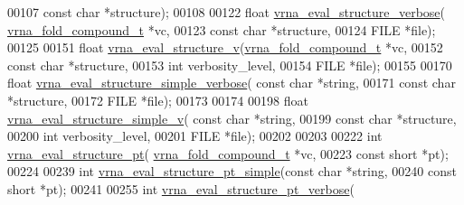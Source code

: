 \begin{DoxyCode}
00107                                   \textcolor{keyword}{const} \textcolor{keywordtype}{char} *structure);
00108 
00122 \textcolor{keywordtype}{float} \hyperlink{group__eval_ga0928d699d310178f84ee2351034e5cb5}{vrna\_eval\_structure\_verbose}(
      \hyperlink{group__fold__compound_structvrna__fc__s}{vrna\_fold\_compound\_t} *vc,
00123                                   \textcolor{keyword}{const} \textcolor{keywordtype}{char} *structure,
00124                                   FILE *file);
00125 
00151 \textcolor{keywordtype}{float} \hyperlink{group__eval_gab12e6b1226227670322150df018734f8}{vrna\_eval\_structure\_v}(\hyperlink{group__fold__compound_structvrna__fc__s}{vrna\_fold\_compound\_t} *vc,
00152                             \textcolor{keyword}{const} \textcolor{keywordtype}{char} *structure,
00153                             \textcolor{keywordtype}{int} verbosity\_level,
00154                             FILE *file);
00155 
00170 \textcolor{keywordtype}{float} \hyperlink{group__eval_ga4c2895a7dcd756ef2dc7f76db7c4c53e}{vrna\_eval\_structure\_simple\_verbose}( \textcolor{keyword}{const} \textcolor{keywordtype}{char} *\textcolor{keywordtype}{string},
00171                                           \textcolor{keyword}{const} \textcolor{keywordtype}{char} *structure,
00172                                           FILE *file);
00173 
00174 
00198 \textcolor{keywordtype}{float} \hyperlink{group__eval_gaddb30ac265f1a39557170e7acac4930f}{vrna\_eval\_structure\_simple\_v}( \textcolor{keyword}{const} \textcolor{keywordtype}{char} *\textcolor{keywordtype}{string},
00199                                     \textcolor{keyword}{const} \textcolor{keywordtype}{char} *structure,
00200                                     \textcolor{keywordtype}{int} verbosity\_level,
00201                                     FILE *file);
00202 
00203 
00222 \textcolor{keywordtype}{int} \hyperlink{group__eval_gadbd09372ddfd7a450bbd590c96a6bfe4}{vrna\_eval\_structure\_pt}( \hyperlink{group__fold__compound_structvrna__fc__s}{vrna\_fold\_compound\_t} *vc,
00223                             \textcolor{keyword}{const} \textcolor{keywordtype}{short} *pt);
00224 
00239 \textcolor{keywordtype}{int} \hyperlink{group__eval_ga0bba59b4d6e53461088666ff4aece7b0}{vrna\_eval\_structure\_pt\_simple}(\textcolor{keyword}{const} \textcolor{keywordtype}{char} *\textcolor{keywordtype}{string},
00240                                   \textcolor{keyword}{const} \textcolor{keywordtype}{short} *pt);
00241 
00255 \textcolor{keywordtype}{int} \hyperlink{group__eval_ga8a517cfeeae8c376ae7b1e0c401d38b4}{vrna\_eval\_structure\_pt\_verbose}( 

\end{DoxyCode}
